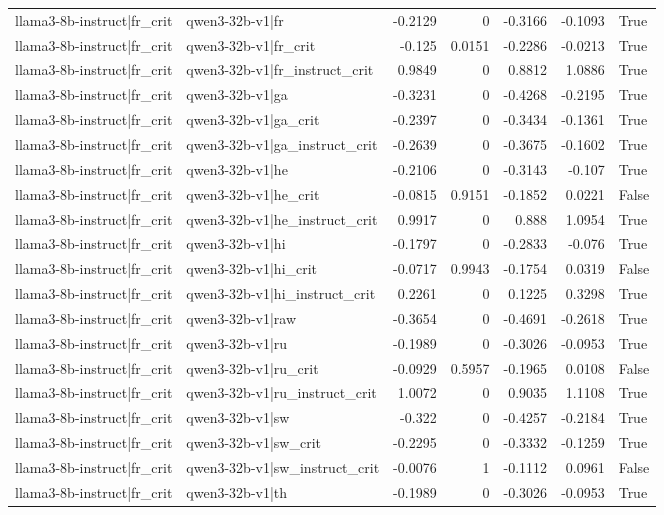 \begin{table}
\begin{tabular}{l l r r r r l}
llama3-8b-instruct|fr_crit & qwen3-32b-v1|fr & -0.2129 & 0 & -0.3166 & -0.1093 & True \\
llama3-8b-instruct|fr_crit & qwen3-32b-v1|fr_crit & -0.125 & 0.0151 & -0.2286 & -0.0213 & True \\
llama3-8b-instruct|fr_crit & qwen3-32b-v1|fr_instruct_crit & 0.9849 & 0 & 0.8812 & 1.0886 & True \\
llama3-8b-instruct|fr_crit & qwen3-32b-v1|ga & -0.3231 & 0 & -0.4268 & -0.2195 & True \\
llama3-8b-instruct|fr_crit & qwen3-32b-v1|ga_crit & -0.2397 & 0 & -0.3434 & -0.1361 & True \\
llama3-8b-instruct|fr_crit & qwen3-32b-v1|ga_instruct_crit & -0.2639 & 0 & -0.3675 & -0.1602 & True \\
llama3-8b-instruct|fr_crit & qwen3-32b-v1|he & -0.2106 & 0 & -0.3143 & -0.107 & True \\
llama3-8b-instruct|fr_crit & qwen3-32b-v1|he_crit & -0.0815 & 0.9151 & -0.1852 & 0.0221 & False \\
llama3-8b-instruct|fr_crit & qwen3-32b-v1|he_instruct_crit & 0.9917 & 0 & 0.888 & 1.0954 & True \\
llama3-8b-instruct|fr_crit & qwen3-32b-v1|hi & -0.1797 & 0 & -0.2833 & -0.076 & True \\
llama3-8b-instruct|fr_crit & qwen3-32b-v1|hi_crit & -0.0717 & 0.9943 & -0.1754 & 0.0319 & False \\
llama3-8b-instruct|fr_crit & qwen3-32b-v1|hi_instruct_crit & 0.2261 & 0 & 0.1225 & 0.3298 & True \\
llama3-8b-instruct|fr_crit & qwen3-32b-v1|raw & -0.3654 & 0 & -0.4691 & -0.2618 & True \\
llama3-8b-instruct|fr_crit & qwen3-32b-v1|ru & -0.1989 & 0 & -0.3026 & -0.0953 & True \\
llama3-8b-instruct|fr_crit & qwen3-32b-v1|ru_crit & -0.0929 & 0.5957 & -0.1965 & 0.0108 & False \\
llama3-8b-instruct|fr_crit & qwen3-32b-v1|ru_instruct_crit & 1.0072 & 0 & 0.9035 & 1.1108 & True \\
llama3-8b-instruct|fr_crit & qwen3-32b-v1|sw & -0.322 & 0 & -0.4257 & -0.2184 & True \\
llama3-8b-instruct|fr_crit & qwen3-32b-v1|sw_crit & -0.2295 & 0 & -0.3332 & -0.1259 & True \\
llama3-8b-instruct|fr_crit & qwen3-32b-v1|sw_instruct_crit & -0.0076 & 1 & -0.1112 & 0.0961 & False \\
llama3-8b-instruct|fr_crit & qwen3-32b-v1|th & -0.1989 & 0 & -0.3026 & -0.0953 & True \\

\end{tabular}
\end{table}
